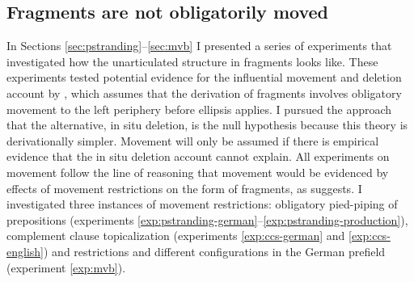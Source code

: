 \subsection{Fragments are not obligatorily moved}
In Sections \ref{sec:pstranding}--\ref{sec:mvb} I presented a series of experiments that investigated how the unarticulated structure in fragments looks like. These experiments tested potential evidence for the influential movement and deletion account by \citet{merchant2004}, which assumes that the derivation of fragments involves obligatory movement to the left periphery before ellipsis applies. I pursued the approach that the alternative, in situ deletion, is the null hypothesis because this theory is derivationally simpler. Movement will only be assumed if there is empirical evidence that the in situ deletion account cannot explain. All experiments on movement follow the line of reasoning that movement would be evidenced by effects of movement restrictions on the form of fragments, as \citet{merchant2004} suggests. I investigated three instances of movement restrictions: obligatory pied-piping of prepositions (experiments \ref{exp:pstranding-german}--\ref{exp:pstranding-production}), complement clause topicalization (experiments \ref{exp:ccs-german} and \ref{exp:ccs-english}) and restrictions and different configurations in the German prefield (experiment \ref{exp:mvb}).

